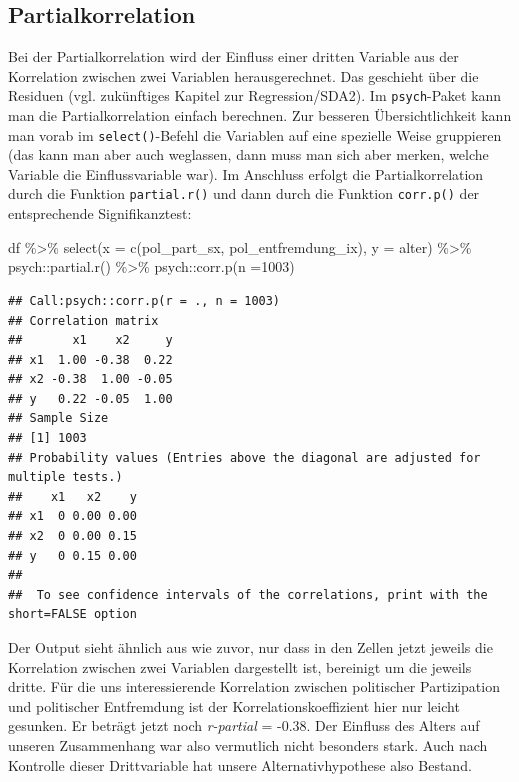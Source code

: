 \documentclass[
]{book}
\newenvironment{Shaded}{\begin{snugshade}}{\end{snugshade}}
\newcommand{\AttributeTok}[1]{\textcolor[rgb]{0.77,0.63,0.00}{#1}}
\newcommand{\DecValTok}[1]{\textcolor[rgb]{0.00,0.00,0.81}{#1}}
\newcommand{\FunctionTok}[1]{\textcolor[rgb]{0.00,0.00,0.00}{#1}}
\newcommand{\NormalTok}[1]{#1}
\newcommand{\SpecialCharTok}[1]{\textcolor[rgb]{0.00,0.00,0.00}{#1}}
\begin{document}
\hypertarget{partialkorrelation}{%
\subsection{Partialkorrelation}\label{partialkorrelation}}

Bei der Partialkorrelation wird der Einfluss einer dritten Variable aus der Korrelation zwischen zwei Variablen herausgerechnet. Das geschieht über die Residuen (vgl. zukünftiges Kapitel zur Regression/SDA2). Im \texttt{psych}-Paket kann man die Partialkorrelation einfach berechnen. Zur besseren Übersichtlichkeit kann man vorab im \texttt{select()}-Befehl die Variablen auf eine spezielle Weise gruppieren (das kann man aber auch weglassen, dann muss man sich aber merken, welche Variable die Einflussvariable war). Im Anschluss erfolgt die Partialkorrelation durch die Funktion \texttt{partial.r()} und dann durch die Funktion \texttt{corr.p()} der entsprechende Signifikanztest:

\begin{Shaded}
\begin{Highlighting}[]
\NormalTok{df }\SpecialCharTok{\%\textgreater{}\%} 
  \FunctionTok{select}\NormalTok{(}\AttributeTok{x =} \FunctionTok{c}\NormalTok{(pol\_part\_sx, pol\_entfremdung\_ix), }\AttributeTok{y =}\NormalTok{ alter) }\SpecialCharTok{\%\textgreater{}\%} 
\NormalTok{  psych}\SpecialCharTok{::}\FunctionTok{partial.r}\NormalTok{() }\SpecialCharTok{\%\textgreater{}\%} 
\NormalTok{  psych}\SpecialCharTok{::}\FunctionTok{corr.p}\NormalTok{(}\AttributeTok{n =}\DecValTok{1003}\NormalTok{)}
\end{Highlighting}
\end{Shaded}

\begin{verbatim}
## Call:psych::corr.p(r = ., n = 1003)
## Correlation matrix 
##       x1    x2     y
## x1  1.00 -0.38  0.22
## x2 -0.38  1.00 -0.05
## y   0.22 -0.05  1.00
## Sample Size 
## [1] 1003
## Probability values (Entries above the diagonal are adjusted for multiple tests.) 
##    x1   x2    y
## x1  0 0.00 0.00
## x2  0 0.00 0.15
## y   0 0.15 0.00
## 
##  To see confidence intervals of the correlations, print with the short=FALSE option
\end{verbatim}

Der Output sieht ähnlich aus wie zuvor, nur dass in den Zellen jetzt jeweils die Korrelation zwischen zwei Variablen dargestellt ist, bereinigt um die jeweils dritte. Für die uns interessierende Korrelation zwischen politischer Partizipation und politischer Entfremdung ist der Korrelationskoeffizient hier nur leicht gesunken. Er beträgt jetzt noch \emph{r-partial} = -0.38. Der Einfluss des Alters auf unseren Zusammenhang war also vermutlich nicht besonders stark. Auch nach Kontrolle dieser Drittvariable hat unsere Alternativhypothese also Bestand.
\end{document}
